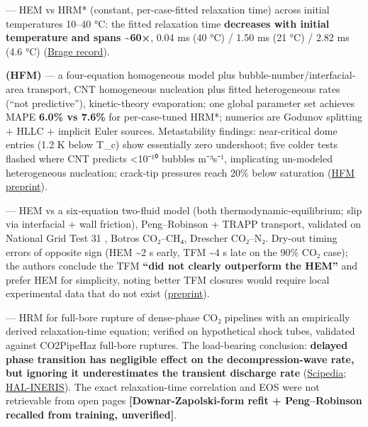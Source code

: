 \textbf{\citet{log2024hrm}} --- HEM vs HRM* (constant,
per-case-fitted relaxation time) across initial temperatures 10--40 °C:
the fitted relaxation time \textbf{decreases with initial temperature
and spans \textasciitilde60×}, 0.04 ms (40 °C) / 1.50 ms (21 °C) / 2.82
ms (4.6 °C)
(\href{https://sintef.brage.unit.no/sintef-xmlui/handle/11250/3103647}{Brage
record}).

\textbf{\citet{log2024hfm} (HFM)}
--- a four-equation homogeneous model plus
bubble-number/interfacial-area transport, CNT homogeneous nucleation
plus fitted heterogeneous rates (``not predictive''), kinetic-theory
evaporation; one global parameter set achieves MAPE \textbf{6.0\% vs
7.6\%} for per-case-tuned HRM*; numerics are Godunov splitting + HLLC +
implicit Euler sources. Metastability findings: near-critical dome
entries (1.2 K below T\_c) show essentially zero undershoot; five colder
tests flashed where CNT predicts \textless10⁻¹⁰ bubbles m⁻³s⁻¹,
implicating un-modeled heterogeneous nucleation; crack-tip pressures
reach 20\% below saturation
(\href{https://www.pvv.ntnu.no/~stm/dring/hfm_preprint.pdf}{HFM
preprint}).

\textbf{\citet{munkejord2015}} --- HEM vs a six-equation two-fluid model
(both thermodynamic-equilibrium; slip via interfacial + wall friction),
Peng--Robinson + TRAPP transport, validated on National Grid Test 31
\citep{cosham2012}, Botros CO₂--CH₄, Drescher CO₂--N₂. Dry-out timing
errors of opposite sign (HEM \textasciitilde2 s early, TFM
\textasciitilde4 s late on the 90\% CO₂ case); the authors conclude the
TFM \textbf{``did not clearly outperform the HEM''} and prefer HEM for
simplicity, noting better TFM closures would require local experimental
data that do not exist
(\href{https://www.sintef.no/globalassets/project/co2-dynamics/publications/depress-mix-preprint.pdf}{preprint}).

\textbf{\citet{brown2013}} --- HRM for full-bore rupture of
dense-phase CO₂ pipelines with an empirically derived relaxation-time
equation; verified on hypothetical shock tubes, validated against
CO2PipeHaz full-bore ruptures. The load-bearing conclusion:
\textbf{delayed phase transition has negligible effect on the
decompression-wave rate, but ignoring it underestimates the transient
discharge rate}
(\href{https://www.scipedia.com/public/Brown_et_al_2013a}{Scipedia};
\href{https://hal-ineris.archives-ouvertes.fr/ineris-00963485}{HAL-INERIS}).
The exact relaxation-time correlation and EOS were not retrievable from
open pages \textbf{{[}Downar-Zapolski-form refit + Peng--Robinson
recalled from training, unverified{]}}.

